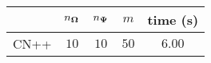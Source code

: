 \centering
\renewcommand{\arraystretch}{1.2}
\begin{tabular}{@{}lcccc@{}}
\toprule
 & $n_{\boldsymbol{\Omega}}$ & $n_{\boldsymbol{\Psi}}$ & $m$ & time (s)\\
\midrule
CN++ & $10$ & $10$ & $50$ & $6.00$ \\
\bottomrule
\end{tabular}
